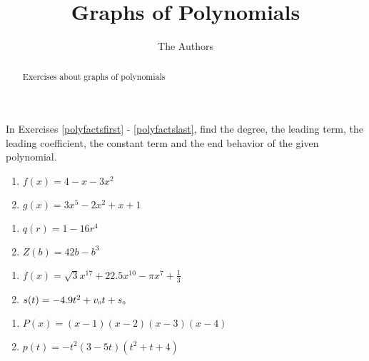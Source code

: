 \documentclass{ximera}
\author{The Authors}
\title{Graphs of Polynomials}
\begin{document}
\begin{abstract}
Exercises about graphs of polynomials
\end{abstract}
\maketitle

\renewcommand{\theenumi}{\arabic{enumi}.}

In Exercises \ref{polyfactsfirst} - \ref{polyfactslast}, find the degree, the leading term, the leading coefficient, the constant term and the end behavior of the given polynomial.

\begin{multicols}{2}
\begin{enumerate}

\item  $f(x) = 4-x-3x^2$ \label{polyfactsfirst}
\item  $g(x) = 3x^5 - 2x^2 + x + 1$

\setcounter{HW}{\value{enumi}}
\end{enumerate}
\end{multicols}

\begin{multicols}{2}
\begin{enumerate}
\setcounter{enumi}{\value{HW}}

\item $q(r) = 1 - 16r^{4}$
\item $Z(b) = 42b - b^{3}$

\setcounter{HW}{\value{enumi}}
\end{enumerate}
\end{multicols}


\begin{multicols}{2}
\begin{enumerate}
\setcounter{enumi}{\value{HW}}

\item $f(x) = \sqrt{3}x^{17} + 22.5x^{10} - \pi x^{7} + \frac{1}{3}$
\item $s(t) = -4.9t^{2} + v_{\mbox{\tiny $0$}}t + s_{\mbox{\tiny $0$}}$

\setcounter{HW}{\value{enumi}}
\end{enumerate}
\end{multicols}

\begin{multicols}{2}
\begin{enumerate}
\setcounter{enumi}{\value{HW}}

\item $P(x) = (x - 1)(x - 2)(x - 3)(x - 4)$
\item $p(t) = -t^2(3 - 5t)(t^{2} + t + 4)$

\setcounter{HW}{\value{enumi}}
\end{enumerate}
\end{multicols}
\end{document}
